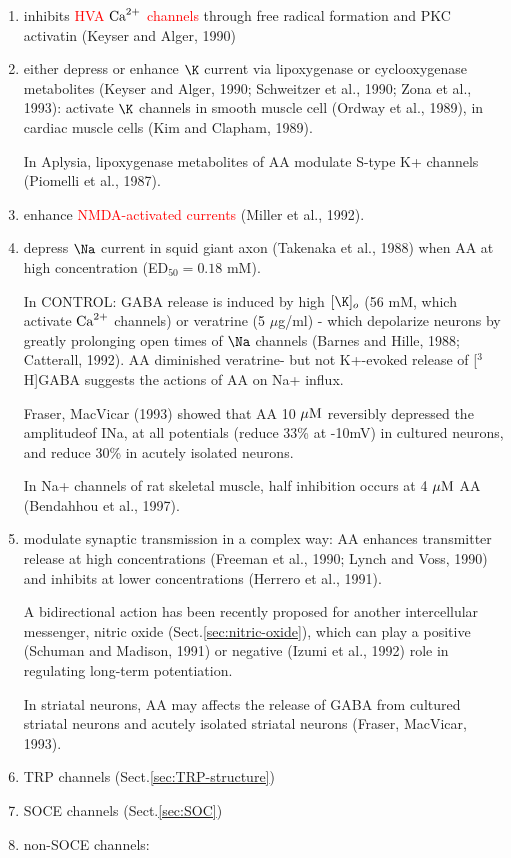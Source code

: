 \begin{enumerate}
  \item inhibits \textcolor{red}{HVA ${\text{Ca}^{2+}}$ channels} through free radical
  formation and PKC activatin (Keyser and Alger, 1990)
  
  \item either depress or enhance $\K$ current via lipoxygenase or
  cyclooxygenase metabolites (Keyser and Alger, 1990; Schweitzer et al., 1990;
  Zona et al., 1993): activate $\K$ channels in smooth muscle cell (Ordway et
  al., 1989), in cardiac muscle cells (Kim and Clapham, 1989).
 
In Aplysia, lipoxygenase metabolites of AA modulate S-type K+ channels (Piomelli
et al., 1987).

   \item enhance \textcolor{red}{NMDA-activated currents} (Miller et al., 1992).
   
   \item depress $\Na$ current in squid giant axon (Takenaka et al.,
1988) when AA at high concentration (ED$_{50}=0.18$ mM). 

In CONTROL: GABA release is induced by high $[\K]_o$ (56 mM, which activate
${\text{Ca}^{2+}}$ channels) or veratrine (5 $\mu$g/ml) - which depolarize neurons by greatly
prolonging open times of $\Na$ channels (Barnes and Hille, 1988; Catterall,
1992).
AA diminished veratrine- but not K+-evoked release of [$^3$H]GABA suggests the
actions of AA on Na+ influx.

Fraser, MacVicar (1993) showed that AA 10 ${\mu\text{M}}$ reversibly depressed the
amplitudeof INa, at all potentials (reduce 33\% at -10mV) in cultured neurons,
and reduce 30\% in acutely isolated neurons.

In Na+ channels of rat skeletal muscle, half inhibition occurs at 4 ${\mu\text{M}}$ AA
(Bendahhou et al., 1997).

   \item modulate synaptic transmission in a complex way:
   AA enhances transmitter release at high concentrations (Freeman et al., 1990;
   Lynch and Voss, 1990) and inhibits at lower concentrations (Herrero et al.,
   1991).

A bidirectional action has been recently proposed for another intercellular
messenger, nitric oxide (Sect.\ref{sec:nitric-oxide}), which can play a positive
(Schuman and Madison, 1991) or negative (Izumi et al., 1992) role in regulating
long-term potentiation.

In striatal neurons, AA may affects the release of GABA from cultured striatal
neurons and acutely isolated striatal neurons (Fraser, MacVicar, 1993).
 
   \item TRP channels (Sect.\ref{sec:TRP-structure})
   
   \item SOCE channels (Sect.\ref{sec:SOC}) 
   
   \item non-SOCE channels:  
\end{enumerate}

